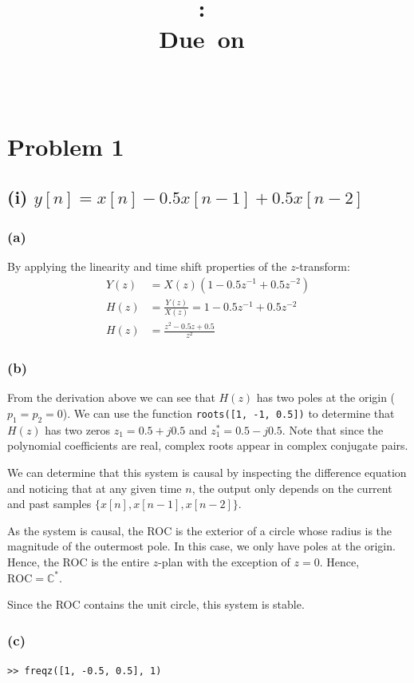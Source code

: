 \documentclass{article}
\title{
\vspace{2in}
\textmd{\textbf{\hmwkClass:\ \hmwkTitle}}\\
\normalsize\vspace{0.1in}\small{Due\ on\ \hmwkDueDate}\\
\vspace{0.1in}\large{\textit{\hmwkClassInstructor\ \hmwkClassTime}}
\vspace{3in}
}
\author{\textbf{\hmwkAuthorName}}
\date{} %
\begin{document}
\section{Problem 1}
\subsection{(i) $y[n] = x[n] - 0.5x[n-1] + 0.5x[n-2]$}
\subsubsection{(a)}
By applying the linearity and time shift properties of the $z$-transform:
\begin{align} \nonumber
Y(z) &= X(z)(1 - 0.5z^{-1} + 0.5z^{-2}) \\
H(z) &= \frac{Y(z)}{X(z)} = 1 - 0.5z^{-1} + 0.5z^{-2} \\
			H(z) &= \frac{z^2 - 0.5z + 0.5}{z^2}
\end{align}
\subsubsection{(b)}
From the derivation above we can see that $H(z)$ has two poles at the origin ($p_1 = p_2 = 0$). We can use the function \texttt{roots([1, -1, 0.5])} to determine that $H(z)$ has two zeros $z_1 = 0.5 + j0.5$ and $z_1^* = 0.5 - j0.5$. Note that since the polynomial coefficients are real, complex roots appear in complex conjugate pairs.

We can determine that this system is causal by inspecting the difference equation and noticing that at any given time $n$, the output only depends on the current and past samples $\{x[n], x[n-1], x[n-2]\}$. 

As the system is causal, the ROC is the exterior of a circle whose radius is the magnitude of the outermost pole. In this case, we only have poles at the origin. Hence, the ROC is the entire $z$-plan with the exception of $z = 0$. Hence, $\mathrm{ROC} = \mathbb{C}^*$.

Since the ROC contains the unit circle, this system is stable.

\begin{center}
	\resizebox{0.5\linewidth}{!}{}
\end{center}
	
\subsubsection{(c)}
\texttt{>> freqz([1, -0.5, 0.5], 1)}
\end{document}
